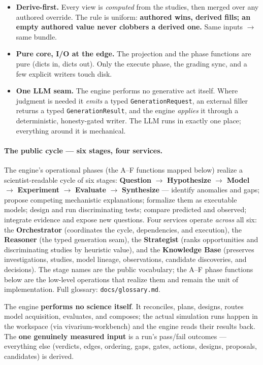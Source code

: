 \documentclass[11pt]{article}
\newcommand{\code}[1]{\texttt{\small #1}}
\begin{document}
\begin{itemize}
\item \textbf{Derive-first.} Every view is \emph{computed} from the studies, then merged over
any authored override. The rule is uniform: \textbf{authored wins, derived fills; an empty
authored value never clobbers a derived one.} Same inputs $\rightarrow$ same bundle.
\item \textbf{Pure core, I/O at the edge.} The projection and the phase functions are pure
(dicts in, dicts out). Only the execute phase, the grading sync, and a few explicit writers
touch disk.
\item \textbf{One LLM seam.} The engine performs no generative act itself. Where judgment is
needed it \emph{emits} a typed \code{GenerationRequest}, an external filler returns a typed
\code{GenerationResult}, and the engine \emph{applies} it through a deterministic, honesty-gated
writer. The LLM runs in exactly one place; everything around it is mechanical.
\end{itemize}

\paragraph{The public cycle --- six stages, four services.} The engine's operational phases
(the A--F functions mapped below) realize a scientist-readable cycle of six stages:
\textbf{Question} $\rightarrow$ \textbf{Hypothesize} $\rightarrow$ \textbf{Model} $\rightarrow$
\textbf{Experiment} $\rightarrow$ \textbf{Evaluate} $\rightarrow$ \textbf{Synthesize} ---
identify anomalies and gaps; propose competing mechanistic explanations; formalize them as
executable models; design and run discriminating tests; compare predicted and observed; integrate
evidence and expose new questions. Four services operate \emph{across} all six: the
\textbf{Orchestrator} (coordinates the cycle, dependencies, and execution), the \textbf{Reasoner}
(the typed generation seam), the \textbf{Strategist} (ranks opportunities and discriminating
studies by heuristic value), and the \textbf{Knowledge Base} (preserves investigations, studies,
model lineage, observations, candidate discoveries, and decisions). The stage names are the public
vocabulary; the A--F phase functions below are the low-level operations that realize them and remain
the unit of implementation. Full glossary: \code{docs/glossary.md}.

The engine \textbf{performs no science itself}. It reconciles, plans, designs, routes model
acquisition, evaluates, and composes; the actual simulation runs happen in the workspace
(via vivarium-workbench) and the engine reads their results back. The \textbf{one genuinely
measured input} is a run's pass/fail outcomes --- everything else (verdicts, edges, ordering,
gaps, gates, actions, designs, proposals, candidates) is derived.
\end{document}
